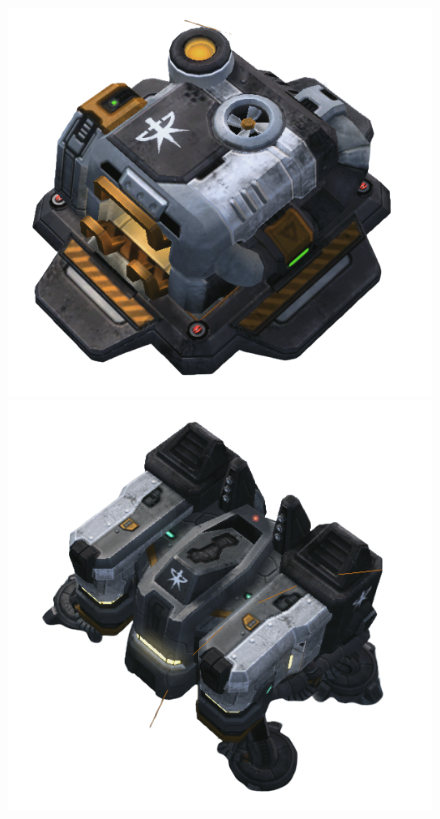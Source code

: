 \documentclass[12pt,a4paper]{article}
\begin{document}
\begin{figure}
    \includegraphics[width=\linewidth]{Figures/depot.png}
    \endminipage\hfill
    \includegraphics[width=\linewidth]{Figures/barracks.png}

\end{figure}
\end{document}
